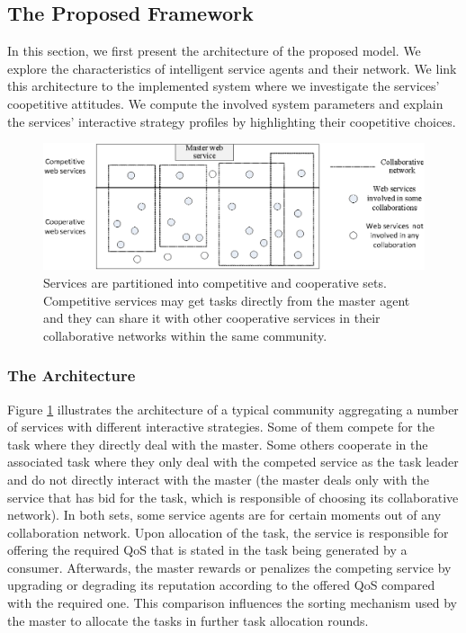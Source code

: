 \subsection{The Proposed Framework}\label{The Proposed Framework}
In this section, we first present the architecture of the proposed
model. We explore the characteristics of intelligent service
agents and their network. We link this architecture to the
implemented system where we investigate the services' coopetitive
attitudes. We compute the involved system parameters and explain
the services' interactive strategy profiles by highlighting their
coopetitive choices.

\begin{figure}[h]
\centering
\includegraphics[scale=1]{architecture++.eps}
\caption{Services are partitioned into competitive and cooperative
sets. Competitive services may get tasks directly from the master
agent and they can share it with other cooperative services in
their collaborative networks within the same community.}
\label{architectureFigure}
\end{figure}

\subsubsection{The Architecture}

Figure \ref{architectureFigure} illustrates the architecture of a
typical community aggregating a number of services with different
interactive strategies. Some of them compete for the task where
they directly deal with the master. Some others cooperate in the
associated task where they only deal with the competed service as
the task leader and do not directly interact with the master (the
master deals only with the service that has bid for the task,
which is responsible of choosing its collaborative network). In
both sets, some service agents are for certain moments out of any
collaboration network. Upon allocation of
the task, the service is responsible for offering the required QoS
that is stated in the task being generated by a consumer.
Afterwards,  the master rewards or penalizes the competing
service by upgrading or degrading its reputation according to the
offered QoS compared with the required one. This comparison
influences the sorting mechanism used by the master to allocate
the tasks in further task allocation rounds.


